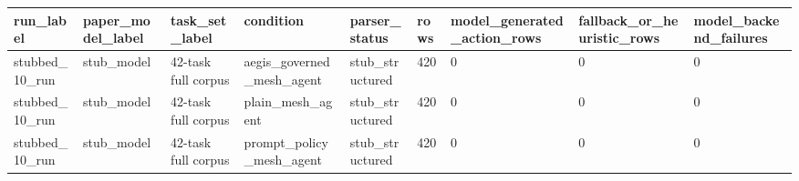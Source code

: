 \begin{tabular}{lllllllll}
 \hline
run\_label & paper\_model\_label & task\_set\_label & condition & parser\_status & rows & model\_generated\_action\_rows & fallback\_or\_heuristic\_rows & model\_backend\_failures \\
 \hline
stubbed\_10\_run & stub\_model & 42-task full corpus & aegis\_governed\_mesh\_agent & stub\_structured & 420 & 0 & 0 & 0 \\
stubbed\_10\_run & stub\_model & 42-task full corpus & plain\_mesh\_agent & stub\_structured & 420 & 0 & 0 & 0 \\
stubbed\_10\_run & stub\_model & 42-task full corpus & prompt\_policy\_mesh\_agent & stub\_structured & 420 & 0 & 0 & 0 \\
 \hline
\end{tabular}

